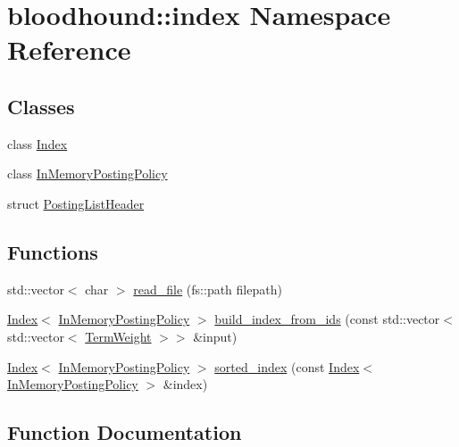 \hypertarget{namespacebloodhound_1_1index}{}\section{bloodhound\+:\+:index Namespace Reference}
\label{namespacebloodhound_1_1index}
\subsection*{Classes}
\begin{DoxyCompactItemize}
\item 
class \hyperlink{classbloodhound_1_1index_1_1Index}{Index}
\item 
class \hyperlink{classbloodhound_1_1index_1_1InMemoryPostingPolicy}{In\+Memory\+Posting\+Policy}
\item 
struct \hyperlink{structbloodhound_1_1index_1_1PostingListHeader}{Posting\+List\+Header}
\end{DoxyCompactItemize}
\subsection*{Functions}
\begin{DoxyCompactItemize}
\item 
std\+::vector$<$ char $>$ \hyperlink{namespacebloodhound_1_1index_a4b6f89a17c10bf2927aff24df7081bb3}{read\+\_\+file} (fs\+::path filepath)
\item 
\hyperlink{classbloodhound_1_1index_1_1Index}{Index}$<$ \hyperlink{classbloodhound_1_1index_1_1InMemoryPostingPolicy}{In\+Memory\+Posting\+Policy} $>$ \hyperlink{namespacebloodhound_1_1index_ac508959a4f3ab5ce65d62f1c294359e2}{build\+\_\+index\+\_\+from\+\_\+ids} (const std\+::vector$<$ std\+::vector$<$ \hyperlink{structbloodhound_1_1TermWeight}{Term\+Weight} $>$$>$ \&input)
\item 
\hyperlink{classbloodhound_1_1index_1_1Index}{Index}$<$ \hyperlink{classbloodhound_1_1index_1_1InMemoryPostingPolicy}{In\+Memory\+Posting\+Policy} $>$ \hyperlink{namespacebloodhound_1_1index_a306f62c55e8d06a9703f552f7cf312c5}{sorted\+\_\+index} (const \hyperlink{classbloodhound_1_1index_1_1Index}{Index}$<$ \hyperlink{classbloodhound_1_1index_1_1InMemoryPostingPolicy}{In\+Memory\+Posting\+Policy} $>$ \&index)
\end{DoxyCompactItemize}


\subsection{Function Documentation}
\mbox{\label{namespacebloodhound_1_1index_ac508959a4f3ab5ce65d62f1c294359e2}} 

